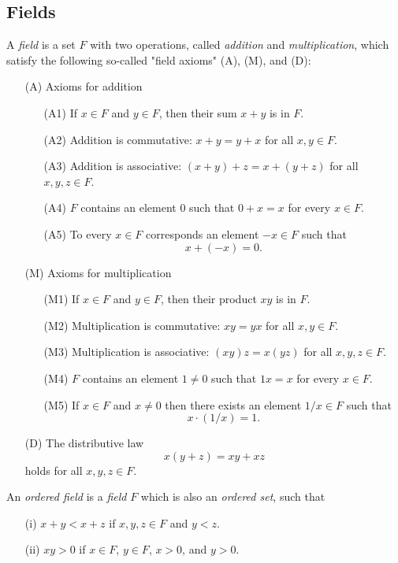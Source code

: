 \subsection{Fields}
\begin{definition}
A \emph{field} is a set $F$ with two operations, called \emph{addition} and \emph{multiplication}, which satisfy the following so-called "field axioms" (A), (M), and (D):
\begin{enumerate}
\item[(A)] Axioms for addition
\begin{itemize}
    \item[(A1)] If $x \in F$ and $y \in F$, then their sum $x+y$ is in $F$.
    \item[(A2)] Addition is commutative: $x+y=y+x$ for all $x,y \in F$.
    \item[(A3)] Addition is associative: $(x+y)+z=x+(y+z)$ for all $x,y,z \in F$.
    \item[(A4)] $F$ contains an element $0$ such that $0+x=x$ for every $x \in F$.
    \item[(A5)] To every $x \in F$ corresponds an element $-x \in F$ such that \[x+(-x)=0.\]
\end{itemize}
\item[(M)] Axioms for multiplication
\begin{itemize}
    \item[(M1)] If $x \in F$ and $y \in F$, then their product $xy$ is in $F$.
    \item[(M2)] Multiplication is commutative: $xy=yx$ for all $x,y \in F$.
    \item[(M3)] Multiplication is associative: $(xy)z=x(yz)$ for all $x,y,z \in F$.
    \item[(M4)] $F$ contains an element $1 \neq 0$ such that $1x=x$ for every $x \in F$.
    \item[(M5)] If $x \in F$ and $x \neq 0$ then there exists an element $1/x \in F$ such that \[x \cdot (1/x) = 1.\]
\end{itemize}
\item[(D)] The distributive law
\[
x(y+z)=xy+xz
\]
holds for all $x,y,z \in F$.
\end{enumerate}
\end{definition}
\begin{definition}
An \emph{ordered field} is a \emph{field} $F$ which is also an \emph{ordered set}, such that
\begin{itemize}
    \item[(i)] $x+y<x+z$ if $x,y,z \in F$ and $y<z$.
    \item[(ii)] $xy>0$ if $x \in F$, $y \in F$, $x>0$, and $y>0$.
\end{itemize}
\end{definition}

